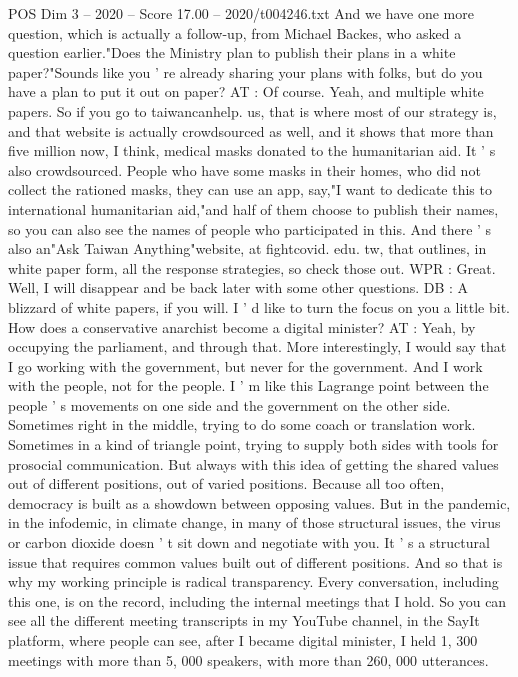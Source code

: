 \begin{textsample}{POS Dim 3 – 2020 – Score 17.00 – 2020/t004246.txt}
And we have one more question, which is actually a follow-up, from Michael Backes, who asked a question earlier."Does the Ministry plan to publish their plans in a white paper?"Sounds like you ' re already sharing your plans with folks, but do you have a plan to put it out on paper?
AT : Of course.
Yeah, and multiple white papers.
So if you go to taiwancanhelp. us, that is where most of our strategy is, and that website is actually crowdsourced as well, and it shows that more than five million now, I think, medical masks donated to the humanitarian aid.
It ' s also crowdsourced.
People who have some masks in their homes, who did not collect the rationed masks, they can use an app, say,"I want to dedicate this to international humanitarian aid,"and half of them choose to publish their names, so you can also see the names of people who participated in this.
And there ' s also an"Ask Taiwan Anything"website, at fightcovid. edu. tw, that outlines, in white paper form, all the response strategies, so check those out.
WPR : Great.
Well, I will disappear and be back later with some other questions.
DB : A blizzard of white papers, if you will.
I ' d like to turn the focus on you a little bit.
How does a conservative anarchist become a digital minister?
AT : Yeah, by occupying the parliament, and through that.
More interestingly, I would say that I go working with the government, but never for the government.
And I work with the people, not for the people.
I ' m like this Lagrange point between the people ' s movements on one side and the government on the other side.
Sometimes right in the middle, trying to do some coach or translation work.
Sometimes in a kind of triangle point, trying to supply both sides with tools for prosocial communication.
But always with this idea of getting the shared values out of different positions, out of varied positions.
Because all too often, democracy is built as a showdown between opposing values.
But in the pandemic, in the infodemic, in climate change, in many of those structural issues, the virus or carbon dioxide doesn ' t sit down and negotiate with you.
It ' s a structural issue that requires common values built out of different positions.
And so that is why my working principle is radical transparency.
Every conversation, including this one, is on the record, including the internal meetings that I hold.
So you can see all the different meeting transcripts in my YouTube channel, in the SayIt platform, where people can see, after I became digital minister, I held 1, 300 meetings with more than 5, 000 speakers, with more than 260, 000 utterances.

\end{textsample}

